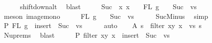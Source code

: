 \begin{isabellebody}
\ \ \ \ \isamarkupfalse%
\ shift{\isacharunderscore}{\kern0pt}down{\isacharunderscore}{\kern0pt}alt\ \isamarkupfalse%
\ blast\isanewline
\ \ \isamarkupfalse%
\ \isamarkupfalse%
\ {\isachardoublequoteopen}Suc\ {\isacharbackquote}{\kern0pt}\ {\isacharparenleft}{\kern0pt}{\isasymlambda}x{\isachardot}{\kern0pt}\ x\ {\isacharminus}{\kern0pt}\ {}{\isacharparenright}{\kern0pt}\ {\isacharbackquote}{\kern0pt}\ {\isacharparenleft}{\kern0pt}FL\ g\ {\isacharminus}{\kern0pt}\ {\isacharbraceleft}{\kern0pt}{}{\isacharbraceright}{\kern0pt}{\isacharparenright}{\kern0pt}\ {\isasymsubseteq}\ Suc\ {\isacharbackquote}{\kern0pt}\ vs{\isachardoublequoteclose}\isanewline
\ \ \ \ \isamarkupfalse%
\ {\isacharparenleft}{\kern0pt}meson\ image{\isacharunderscore}{\kern0pt}mono{\isacharparenright}{\kern0pt}\isanewline
\ \ \isamarkupfalse%
\ \isamarkupfalse%
\ {\isachardoublequoteopen}{\isacharparenleft}{\kern0pt}FL\ g\ {\isacharminus}{\kern0pt}\ {\isacharbraceleft}{\kern0pt}{}{\isacharbraceright}{\kern0pt}{\isacharparenright}{\kern0pt}\ {\isasymsubseteq}\ Suc\ {\isacharbackquote}{\kern0pt}\ vs{\isachardoublequoteclose}\isanewline
\ \ \ \ \isamarkupfalse%
\ SucMinus\ \isamarkupfalse%
\ simp\isanewline
\ \ \isamarkupfalse%
\ \isamarkupfalse%
\ P{}{\isacharcolon}{\kern0pt}\ {\isachardoublequoteopen}FL\ g\ {\isasymsubseteq}\ insert\ {}\ {\isacharparenleft}{\kern0pt}Suc\ {\isacharbackquote}{\kern0pt}\ vs{\isacharparenright}{\kern0pt}{\isachardoublequoteclose}\isanewline
\ \ \ \ \isamarkupfalse%
\ auto\isanewline
\isanewline
\ \ \isamarkupfalse%
\ A{}{\isacharcolon}{\kern0pt}\ {\isachardoublequoteopen}s{}\ {\isacharequal}{\kern0pt}\ filter\ {\isacharparenleft}{\kern0pt}{\isasymlambda}{\isacharparenleft}{\kern0pt}x{\isacharcomma}{\kern0pt}y{\isacharparenright}{\kern0pt}{\isachardot}{\kern0pt}\ x\ {\isasymin}\ vs{\isacharparenright}{\kern0pt}\ s{\isachardoublequoteclose}\isanewline
\ \ \ \ \isamarkupfalse%
\ Nu{\isachardot}{\kern0pt}prems{\isacharparenleft}{\kern0pt}{}{\isacharparenright}{\kern0pt}\ \isamarkupfalse%
\ blast\isanewline
\ \ \isamarkupfalse%
\ \isamarkupfalse%
\ P{}{\isacharcolon}{\kern0pt}\ {\isachardoublequoteopen}filter\ {\isacharparenleft}{\kern0pt}{\isasymlambda}{\isacharparenleft}{\kern0pt}x{\isacharcomma}{\kern0pt}y{\isacharparenright}{\kern0pt}{\isachardot}{\kern0pt}\ x\ {\isasymin}\ insert\ {}\ {\isacharparenleft}{\kern0pt}Suc\ {\isacharbackquote}{\kern0pt}\ vs{\isacharparenright}{\kern0pt}{\isacharparenright}{\kern0pt}\isanewline

\end{isabellebody}
